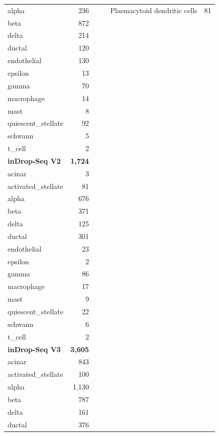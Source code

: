 \documentclass[11pt, a4paper]{article}
\begin{document}
\begin{xltabular}{\textwidth}{>{\raggedright\arraybackslash}X r >{\raggedright\arraybackslash}X r >{\raggedright\arraybackslash}X r}
\quad alpha & 236 &  &  & \quad Plasmacytoid dendritic cells & 81 \\
\quad beta & 872 &  &  &  &  \\
\quad delta & 214 &  &  &  &  \\
\quad ductal & 120 &  &  &  &  \\
\quad endothelial & 130 &  &  &  &  \\
\quad epsilon & 13 &  &  &  &  \\
\quad gamma & 70 &  &  &  &  \\
\quad macrophage & 14 &  &  &  &  \\
\quad mast & 8 &  &  &  &  \\
\quad quiescent\_stellate & 92 &  &  &  &  \\
\quad schwann & 5 &  &  &  &  \\
\quad t\_cell & 2 &  &  &  &  \\
\textbf{inDrop-Seq V2} & \textbf{1,724} &  &  &  &  \\
\quad acinar & 3 &  &  &  &  \\
\quad activated\_stellate & 81 &  &  &  &  \\
\quad alpha & 676 &  &  &  &  \\
\quad beta & 371 &  &  &  &  \\
\quad delta & 125 &  &  &  &  \\
\quad ductal & 301 &  &  &  &  \\
\quad endothelial & 23 &  &  &  &  \\
\quad epsilon & 2 &  &  &  &  \\
\quad gamma & 86 &  &  &  &  \\
\quad macrophage & 17 &  &  &  &  \\
\quad mast & 9 &  &  &  &  \\
\quad quiescent\_stellate & 22 &  &  &  &  \\
\quad schwann & 6 &  &  &  &  \\
\quad t\_cell & 2 &  &  &  &  \\
\textbf{inDrop-Seq V3} & \textbf{3,605} &  &  &  &  \\
\quad acinar & 843 &  &  &  &  \\
\quad activated\_stellate & 100 &  &  &  &  \\
\quad alpha & 1,130 &  &  &  &  \\
\quad beta & 787 &  &  &  &  \\
\quad delta & 161 &  &  &  &  \\
\quad ductal & 376 &  &  &  &  \\

\end{xltabular}
\end{document}

